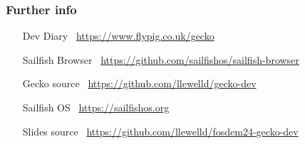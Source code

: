 \documentclass[
	notes=none,
	aspectratio=169
]{beamer}
\begin{document}

\begin{frame}[fragile]
\frametitle{Further info}
\setlength{\leftmargini}{7.0em}
\vspace{0.8cm}

\begin{itemize}
\setlength{\parskip}{1.0em}
\item[Dev Diary] \, \url{https://www.flypig.co.uk/gecko}
\item[Sailfish Browser] \, \url{https://github.com/sailfishos/sailfish-browser}
\item[Gecko source] \, \url{https://github.com/llewelld/gecko-dev}
\item[Sailfish OS] \, \url{https://sailfishos.org}
\item[Slides source] \, \url{https://github.com/llewelld/fosdem24-gecko-dev}
\end{itemize}

\end{frame}

\end{document}
